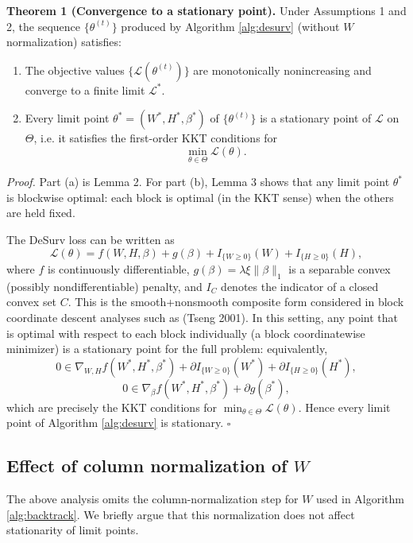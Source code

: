 \documentclass[
]{article}
\begin{document}
\vspace{0.5em}

\textbf{Theorem 1 (Convergence to a stationary point).} Under
Assumptions 1 and 2, the sequence \(\{\theta^{(t)}\}\) produced by
Algorithm \ref{alg:desurv} (without \(W\) normalization) satisfies:

\begin{enumerate}[label=(\alph*)]
  \item The objective values $\{\mathcal{L}(\theta^{(t)})\}$ are monotonically
        nonincreasing and converge to a finite limit $\mathcal{L}^*$.
  \item Every limit point $\theta^* = (W^*,H^*,\beta^*)$ of $\{\theta^{(t)}\}$
        is a stationary point of $\mathcal{L}$ on $\Theta$, i.e. it satisfies
        the first-order KKT conditions for
        \[
          \min_{\theta\in\Theta} \mathcal{L}(\theta).
        \]
\end{enumerate}

\emph{Proof.} Part (a) is Lemma 2. For part (b), Lemma 3 shows that any
limit point \(\theta^*\) is blockwise optimal: each block is optimal (in
the KKT sense) when the others are held fixed.

The DeSurv loss can be written as \[
\mathcal{L}(\theta) = f(W,H,\beta) + g(\beta)
                     + I_{\{W\ge 0\}}(W) + I_{\{H\ge 0\}}(H),
\] where \(f\) is continuously differentiable,
\(g(\beta)=\lambda\xi\|\beta\|_1\) is a separable convex (possibly
nondifferentiable) penalty, and \(I_C\) denotes the indicator of a
closed convex set \(C\). This is the smooth+nonsmooth composite form
considered in block coordinate descent analyses such as (Tseng 2001). In
this setting, any point that is optimal with respect to each block
individually (a block coordinatewise minimizer) is a stationary point
for the full problem: equivalently, \[
0 \in \nabla_{W,H} f(W^*,H^*,\beta^*)
    + \partial I_{\{W\ge 0\}}(W^*)
    + \partial I_{\{H\ge 0\}}(H^*),
\] \[
0 \in \nabla_\beta f(W^*,H^*,\beta^*)
    + \partial g(\beta^*),
\] which are precisely the KKT conditions for
\(\min_{\theta\in\Theta}\mathcal{L}(\theta)\). Hence every limit point
of Algorithm \ref{alg:desurv} is stationary. \hfill\(\square\)

\subsection{Effect of column normalization of $W$}
\label{subsec:conv_normalization}

The above analysis omits the column-normalization step for \(W\) used in
Algorithm \ref{alg:backtrack}. We briefly argue that this normalization
does not affect stationarity of limit points.
\end{document}
